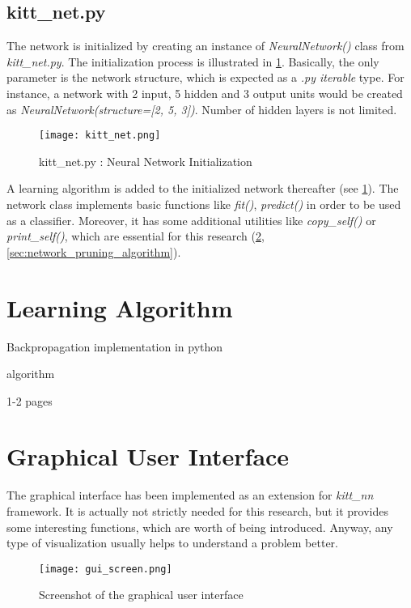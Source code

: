 \subsection*{kitt\_net.py} \label{ssec:kitt_net}
The network is initialized by creating an instance of \textit{NeuralNetwork()} class from \textit{kitt\_net.py}. The initialization process is illustrated in \cref{img:kitt_net}. Basically, the only parameter is the network structure, which is expected as a \textit{.py iterable} type. For instance, a network with 2 input, 5 hidden and 3 output units would be created as \textit{NeuralNetwork(structure=[2, 5, 3])}. Number of hidden layers is not limited.

\begin{figure}[H]
  \centering
  \texttt{[image: kitt\_net.png]}
  \caption{kitt\_net.py : Neural Network Initialization}
  \label{img:kitt_net}
\end{figure}

A learning algorithm is added to the initialized network thereafter (see \cref{sec:learning_algorithm}). The network class implements basic functions like \textit{fit()}, \textit{predict()} in order to be used as a classifier. Moreover, it has some additional utilities like \textit{copy\_self()} or \textit{print\_self()}, which are essential for this research (\cref{sec:gui}, \cref{sec:network_pruning_algorithm}).

\section{Learning Algorithm} \label{sec:learning_algorithm}
Backpropagation implementation in python

algorithm

1-2 pages

\section{Graphical User Interface} \label{sec:gui}
The graphical interface has been implemented as an extension for \textit{kitt\_nn} framework. It is actually not strictly needed for this research, but it provides some interesting functions, which are worth of being introduced. Anyway, any type of visualization usually helps to understand a problem better.

\begin{figure}[H]
  \centering
  \texttt{[image: gui\_screen.png]}
  \caption{Screenshot of the graphical user interface}
  \label{img:gui_screen}
\end{figure}

